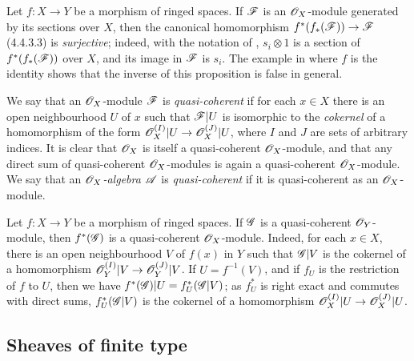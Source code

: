 \begin{env}[5.1.2]
\label{0.5.1.2}
Let $f:X\to Y$ be a morphism of ringed spaces.
If $\mathscr{F}$ is an $\mathscr{O}_X$-module generated by its sections over $X$, then the canonical homomorphism $f^*(f_*(\sh{F}))\to\sh{F}$ (4.4.3.3) is \emph{surjective};
indeed, with the notation of , $s_i\otimes 1$ is a section of $f^*(f_*(\mathscr{F}))$ over $X$, and its image in $\mathscr{F}$ is $s_i$.
The example in  where $f$ is the identity shows that the inverse of this proposition is false in general.

\end{env}

\begin{env}[5.1.3]
\label{0.5.1.3}
We say that an $\mathscr{O}_X$-module $\mathscr{F}$ is \emph{quasi-coherent} if for each $x\in X$ there is an open neighbourhood $U$ of $x$ such that $\mathscr{F}|U$ is isomorphic to the \emph{cokernel} of a homomorphism of the form $\sh{O}_X^{(I)}|U\to\sh{O}_X^{(J)}|U$, where $I$ and $J$ are sets of arbitrary indices.
It is clear that $\mathscr{O}_X$ is itself a quasi-coherent $\mathscr{O}_X$-module, and that any direct sum of quasi-coherent $\mathscr{O}_X$-modules is again a quasi-coherent $\mathscr{O}_X$-module.
We say that an \emph{$\mathscr{O}_X$-algebra $\mathscr{A}$} is \emph{quasi-coherent} if it is quasi-coherent as an $\mathscr{O}_X$-module.
\end{env}

\begin{env}[5.1.4]
\label{0.5.1.4}
Let $f:X\to Y$ be a morphism of ringed spaces.
If $\mathscr{G}$ is a quasi-coherent $\mathscr{O}_Y$-module, then $f^*(\mathscr{G})$ is a quasi-coherent $\mathscr{O}_X$-module.
Indeed, for each $x\in X$, there is an open neighbourhood $V$ of $f(x)$ in $Y$ such that $\mathscr{G}|V$ is the cokernel of a homomorphism $\sh{O}_Y^{(I)}|V\to\sh{O}_Y^{(J)}|V$.
If $U=f^{-1}(V)$, and if $f_U$ is the restriction of $f$ to $U$, then we have $f^*(\mathscr{G})|U=f_U^*(\mathscr{G}|V)$;
as $f_U^*$ is right exact and commutes with direct sums, $f_U^*(\mathscr{G}|V)$ is the cokernel of a homomorphism $\sh{O}_X^{(I)}|U\to\sh{O}_X^{(J)}|U$.
\end{env}

\subsection{Sheaves of finite type}
\label{subsection:0.5.2}


